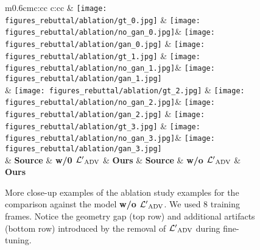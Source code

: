 \documentclass[10pt,twocolumn,letterpaper]{article}
\begin{document}
\begin{figure*}
    \centering
    \setlength{\wid}{0.14\textwidth}
    \addtolength{\tabcolsep}{-4pt}
    \begin{tabular}{m{0.6cm}c:cc c:cc}
        &
        \texttt{[image: figures\_rebuttal/ablation/gt\_0.jpg]}
        \;&\;
        \texttt{[image: figures\_rebuttal/ablation/no\_gan\_0.jpg]}&
        \texttt{[image: figures\_rebuttal/ablation/gan\_0.jpg]}
        \;&\;
        \texttt{[image: figures\_rebuttal/ablation/gt\_1.jpg]}
        \;&\;
        \texttt{[image: figures\_rebuttal/ablation/no\_gan\_1.jpg]}&
        \texttt{[image: figures\_rebuttal/ablation/gan\_1.jpg]}
        \\
        &
        \texttt{[image: figures\_rebuttal/ablation/gt\_2.jpg]}
        \;&\;
        \texttt{[image: figures\_rebuttal/ablation/no\_gan\_2.jpg]}&
        \texttt{[image: figures\_rebuttal/ablation/gan\_2.jpg]}
        \;&\;
        \texttt{[image: figures\_rebuttal/ablation/gt\_3.jpg]}
        \;&\;
        \texttt{[image: figures\_rebuttal/ablation/no\_gan\_3.jpg]}&
        \texttt{[image: figures\_rebuttal/ablation/gan\_3.jpg]}
        \\
        & \textbf{Source} & \textbf{w/0 $\mathcal{L'}_\text{ADV}$} & \textbf{Ours} & \textbf{Source} & \textbf{w/o $\mathcal{L'}_\text{ADV}$} & \textbf{Ours}
    \end{tabular}
    \caption{More close-up examples of the ablation study examples for the comparison against the model \textbf{w/o $\mathcal{L'}_\text{ADV}$}. We used 8 training frames. Notice the geometry gap (top row) and additional artifacts (bottom row) introduced by the removal of $\mathcal{L'}_\text{ADV}$ during fine-tuning.}
    \label{fig:ablationcloseups}
\end{figure*}
\end{document}
